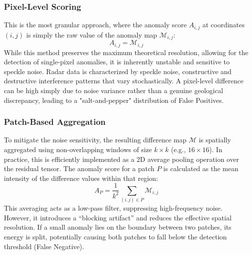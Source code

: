 \subsubsection{Pixel-Level Scoring}
This is the most granular approach, where the anomaly score $A_{i,j}$ at coordinates $(i,j)$ is simply the raw value of the anomaly map $\mathcal{M}_{i,j}$:
$$ A_{i,j} = \mathcal{M}_{i,j} $$
While this method preserves the maximum theoretical resolution, allowing for the detection of single-pixel anomalies, it is inherently unstable and sensitive to speckle noise.
Radar data is characterized by speckle noise, constructive and destructive interference patterns that vary stochastically.
A pixel-level difference can be high simply due to noise variance rather than a genuine geological discrepancy, leading to a "salt-and-pepper" distribution of False Positives.

\subsubsection{Patch-Based Aggregation}
To mitigate the noise sensitivity, the resulting difference map $\mathcal{M}$ is spatially aggregated using non-overlapping windows of size $k \times k$ (e.g., $16 \times 16$).
In practice, this is efficiently implemented as a 2D average pooling operation over the residual tensor.
The anomaly score for a patch $P$ is calculated as the mean intensity of the difference values within that region:
$$ A_P = \frac{1}{k^2} \sum_{(i,j) \in P} \mathcal{M}_{i,j} $$
This averaging acts as a low-pass filter, suppressing high-frequency noise.
However, it introduces a \enquote{blocking artifact} and reduces the effective spatial resolution.
If a small anomaly lies on the boundary between two patches, its energy is split, potentially causing both patches to fall below the detection threshold (False Negative).


